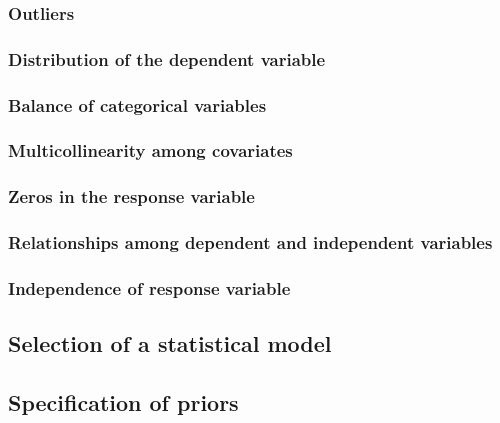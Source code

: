 \documentclass[
]{book}
\begin{document}
\hypertarget{ga-outliers}{%
\subsubsection{Outliers}\label{ga-outliers}}

\hypertarget{pois-dist}{%
\subsubsection{Distribution of the dependent variable}\label{pois-dist}}

\hypertarget{pois-balance}{%
\subsubsection{Balance of categorical variables}\label{pois-balance}}

\hypertarget{pois-collin}{%
\subsubsection{Multicollinearity among covariates}\label{pois-collin}}

\hypertarget{pois-zeros}{%
\subsubsection{Zeros in the response variable}\label{pois-zeros}}

\hypertarget{pois-rels}{%
\subsubsection{Relationships among dependent and independent
variables}\label{pois-rels}}

\hypertarget{pois-indep}{%
\subsubsection{Independence of response variable}\label{pois-indep}}

\hypertarget{pois-select}{%
\subsection{Selection of a statistical model}\label{pois-select}}

\hypertarget{pois-prior-spec}{%
\subsection{Specification of priors}\label{pois-prior-spec}}
\end{document}

